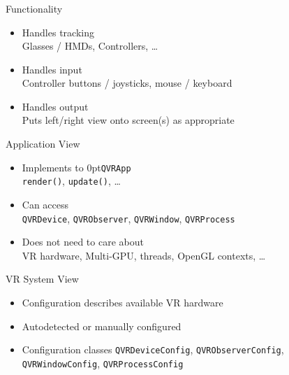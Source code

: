 \documentclass[utf8,stillsansserifmath,fleqn,t]{beamer}
\newcommand{\code}[1]{\texttt{#1}}
\begin{document}
\begin{frame}
\frametitle{\insertsection}
\begin{minipage}[t]{.33\textwidth}
    \centerline{Functionality}\vspace{.5\baselineskip}
    \begin{itemize}
    \item Handles tracking\\
    {\footnotesize Glasses / HMDs, Controllers, \ldots{}}
    \item Handles input\\
    {\footnotesize Controller buttons / joysticks, mouse / keyboard}
    \item Handles output\\
    {\footnotesize Puts left/right view onto screen(s) as appropriate}
    \end{itemize}
\end{minipage}\hfill
\begin{minipage}[t]{.33\textwidth}
    \centerline{Application View}\vspace{.5\baselineskip}
    \begin{itemize}
    \item Implements \hbox to 0pt{\code{QVRApp}}\\
    {\footnotesize
        \code{render()}, \code{update()}, \ldots{}
    }
    \item Can access\\
    {\footnotesize
        \code{QVRDevice},
        \code{QVRObserver},
        \code{QVRWindow},
        \code{QVRProcess}
    }
    \item Does not need to care about\\
    {\footnotesize
        VR hardware, Multi-GPU, threads,
        OpenGL contexts,
        \ldots{}
    }
    \end{itemize}
\end{minipage}\hfill
\begin{minipage}[t]{.33\textwidth}
    \centerline{VR System View}\vspace{.5\baselineskip}
    \begin{itemize}
    \item Configuration describes available VR hardware
    \item Autodetected or manually configured
    \item Configuration classes
    {\footnotesize
        \code{QVRDeviceConfig},
        \code{QVRObserverConfig},
        \code{QVRWindowConfig},
        \code{QVRProcessConfig}
    }
    \end{itemize}
\end{minipage}
\end{frame}
\end{document}
